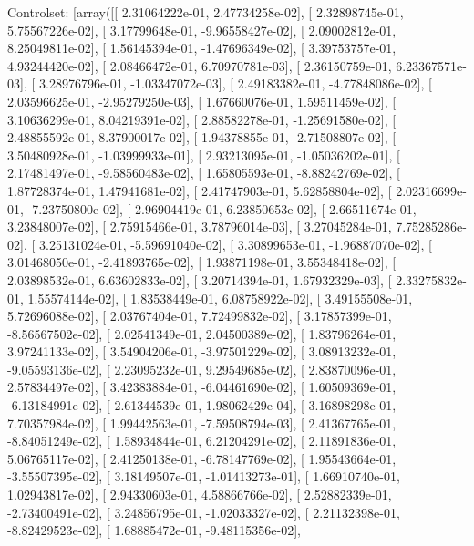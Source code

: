 \documentclass{article}
\begin{document}
Controlset: [array([[ 2.31064222e-01,  2.47734258e-02],
       [ 2.32898745e-01,  5.75567226e-02],
       [ 3.17799648e-01, -9.96558427e-02],
       [ 2.09002812e-01,  8.25049811e-02],
       [ 1.56145394e-01, -1.47696349e-02],
       [ 3.39753757e-01,  4.93244420e-02],
       [ 2.08466472e-01,  6.70970781e-03],
       [ 2.36150759e-01,  6.23367571e-03],
       [ 3.28976796e-01, -1.03347072e-03],
       [ 2.49183382e-01, -4.77848086e-02],
       [ 2.03596625e-01, -2.95279250e-03],
       [ 1.67660076e-01,  1.59511459e-02],
       [ 3.10636299e-01,  8.04219391e-02],
       [ 2.88582278e-01, -1.25691580e-02],
       [ 2.48855592e-01,  8.37900017e-02],
       [ 1.94378855e-01, -2.71508807e-02],
       [ 3.50480928e-01, -1.03999933e-01],
       [ 2.93213095e-01, -1.05036202e-01],
       [ 2.17481497e-01, -9.58560483e-02],
       [ 1.65805593e-01, -8.88242769e-02],
       [ 1.87728374e-01,  1.47941681e-02],
       [ 2.41747903e-01,  5.62858804e-02],
       [ 2.02316699e-01, -7.23750800e-02],
       [ 2.96904419e-01,  6.23850653e-02],
       [ 2.66511674e-01,  3.23848007e-02],
       [ 2.75915466e-01,  3.78796014e-03],
       [ 3.27045284e-01,  7.75285286e-02],
       [ 3.25131024e-01, -5.59691040e-02],
       [ 3.30899653e-01, -1.96887070e-02],
       [ 3.01468050e-01, -2.41893765e-02],
       [ 1.93871198e-01,  3.55348418e-02],
       [ 2.03898532e-01,  6.63602833e-02],
       [ 3.20714394e-01,  1.67932329e-03],
       [ 2.33275832e-01,  1.55574144e-02],
       [ 1.83538449e-01,  6.08758922e-02],
       [ 3.49155508e-01,  5.72696088e-02],
       [ 2.03767404e-01,  7.72499832e-02],
       [ 3.17857399e-01, -8.56567502e-02],
       [ 2.02541349e-01,  2.04500389e-02],
       [ 1.83796264e-01,  3.97241133e-02],
       [ 3.54904206e-01, -3.97501229e-02],
       [ 3.08913232e-01, -9.05593136e-02],
       [ 2.23095232e-01,  9.29549685e-02],
       [ 2.83870096e-01,  2.57834497e-02],
       [ 3.42383884e-01, -6.04461690e-02],
       [ 1.60509369e-01, -6.13184991e-02],
       [ 2.61344539e-01,  1.98062429e-04],
       [ 3.16898298e-01,  7.70357984e-02],
       [ 1.99442563e-01, -7.59508794e-03],
       [ 2.41367765e-01, -8.84051249e-02],
       [ 1.58934844e-01,  6.21204291e-02],
       [ 2.11891836e-01,  5.06765117e-02],
       [ 2.41250138e-01, -6.78147769e-02],
       [ 1.95543664e-01, -3.55507395e-02],
       [ 3.18149507e-01, -1.01413273e-01],
       [ 1.66910740e-01,  1.02943817e-02],
       [ 2.94330603e-01,  4.58866766e-02],
       [ 2.52882339e-01, -2.73400491e-02],
       [ 3.24856795e-01, -1.02033327e-02],
       [ 2.21132398e-01, -8.82429523e-02],
       [ 1.68885472e-01, -9.48115356e-02],
\end{document}
